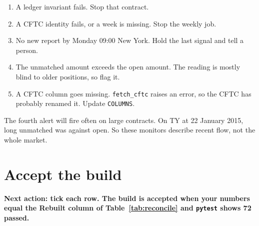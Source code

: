 \documentclass[11pt,a4paper]{article}
\newcommand{\code}[1]{\nolinkurl{#1}}
\newcommand{\sublabel}[1]{\par\vspace{3pt}\needspace{3\baselineskip}{\sffamily\small\bfseries #1}\par\nopagebreak[4]\vspace{1pt}}
\newcommand{\TestCount}{72}
\begin{document}
\sublabel{Alerts}
\begin{enumerate}
\item A ledger invariant fails. Stop that contract.
\item A CFTC identity fails, or a week is missing. Stop the weekly job.
\item No new report by Monday 09:00 New York. Hold the last signal and tell a person.
\item The unmatched amount exceeds the open amount. The reading is mostly blind to older positions, so flag it.
\item A CFTC column goes missing. \code{fetch_cftc} raises an error, so the CFTC has probably renamed it. Update \code{COLUMNS}.
\end{enumerate}

The fourth alert will fire often on large contracts. On TY at 22 January 2015, long unmatched was \TyLongUnmatched{} against \TyLongOpen{} open. So these monitors describe recent flow, not the whole market.

\section{Accept the build}\label{sec:accept}

\textbf{Next action: tick each row. The build is accepted when your numbers equal the Rebuilt column of Table~\ref{tab:reconcile} and \code{pytest} shows \TestCount{} passed.}
\end{document}
